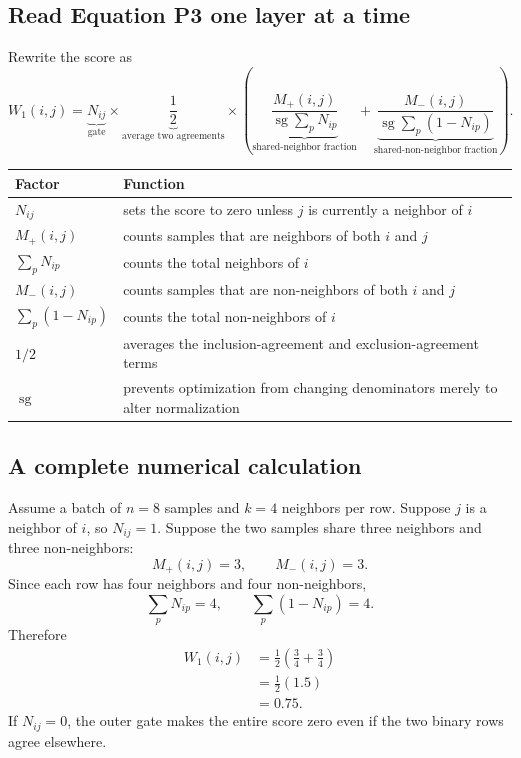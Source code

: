 \documentclass[11pt,oneside,openany]{book}
\theoremstyle{myplain}
\theoremstyle{definition}
\newcommand{\sg}{\operatorname{sg}}
\begin{document}
\subsection{Read Equation P3 one layer at a time}

Rewrite the score as
\[
W_1(i,j)=
\underbrace{N_{ij}}_{\text{gate}}
\times
\underbrace{\frac{1}{2}}_{\text{average two agreements}}
\times
\left(
\underbrace{\frac{M_+(i,j)}{\sg\sum_pN_{ip}}}_{\text{shared-neighbor fraction}}
+
\underbrace{\frac{M_-(i,j)}{\sg\sum_p(1-N_{ip})}}_{\text{shared-non-neighbor fraction}}
\right).
\]

\begin{center}
\begin{tabularx}{\textwidth}{>{\bfseries}l X}
\toprule
Factor & Function \\
\midrule
$N_{ij}$ & sets the score to zero unless $j$ is currently a neighbor of $i$ \\
$M_+(i,j)$ & counts samples that are neighbors of both $i$ and $j$ \\
$\sum_pN_{ip}$ & counts the total neighbors of $i$ \\
$M_-(i,j)$ & counts samples that are non-neighbors of both $i$ and $j$ \\
$\sum_p(1-N_{ip})$ & counts the total non-neighbors of $i$ \\
$1/2$ & averages the inclusion-agreement and exclusion-agreement terms \\
$\sg$ & prevents optimization from changing denominators merely to alter normalization \\
\bottomrule
\end{tabularx}
\end{center}

\subsection{A complete numerical calculation}

Assume a batch of $n=8$ samples and $k=4$ neighbors per row. Suppose $j$ is a neighbor of $i$, so $N_{ij}=1$. Suppose the two samples share three neighbors and three non-neighbors:
\[
M_+(i,j)=3,\qquad M_-(i,j)=3.
\]
Since each row has four neighbors and four non-neighbors,
\[
\sum_pN_{ip}=4,
\qquad
\sum_p(1-N_{ip})=4.
\]
Therefore
\begin{align*}
W_1(i,j)
&=\frac{1}{2}\left(\frac{3}{4}+\frac{3}{4}\right)\\
&=\frac{1}{2}(1.5)\\
&=0.75.
\end{align*}
If $N_{ij}=0$, the outer gate makes the entire score zero even if the two binary rows agree elsewhere.
\end{document}
